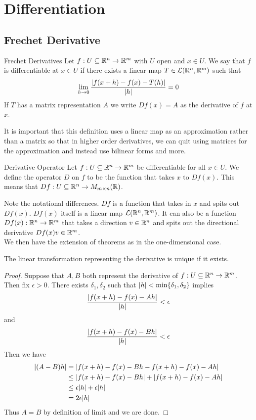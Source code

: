 \documentclass[a4paper]{article}
\begin{document}
\pagebreak
\section{Differentiation}
\subsection{Frechet Derivative}
\begin{defn}{Frechet Derivatives}{} Let $f:U\subseteq\mathbb{R}^n\to\mathbb{R}^m$ with $U$ open and $x\in U$. We say that $f$ is differentiable at $x\in U$ if there exists a linear map $T\in\mathcal{L}(\mathbb{R}^n,\mathbb{R}^m)$ such that $$\lim_{h\to 0}\frac{\abs{f(x +h)-f(x)-T(h)}}{\abs{h}}=0$$ If $T$ has a matrix representation $A$ we write $Df(x)=A$ as the derivative of $f$ at $x$. 
\end{defn}

It is important that this definition uses a linear map as an approximation rather than a matrix so that in higher order derivatives, we can quit using matrices for the approximation and instead use bilinear forms and more. 

\begin{defn}{Derivative Operator}{} Let $f:U\subseteq\mathbb{R}^n\to\mathbb{R}^m$ be differentiable for all $x\in U$. We define the operator $D$ on $f$ to be the function that takes $x$ to $Df(x)$. This means that $Df:U\subseteq\mathbb{R}^n\to M_{m\times n}(\mathbb{R})$. 
\end{defn}

Note the notational differences. $Df$ is a function that takes in $x$ and spits out $Df(x)$. $Df(x)$ itself is a linear map $\mathcal{L}(\mathbb{R}^n,\mathbb{R}^m)$. It can also be a function $Df(x):\mathbb{R}^n\to\mathbb{R}^m$ that takes a direction $v\in\mathbb{R}^n$ and spits out the directional derivative $Df(x)v\in\mathbb{R}^m$. \\

We then have the extension of theorems as in the one-dimensional case. 

\begin{thm}{}{} The linear transformation representing the derivative is unique if it exists. 
\begin{proof}
Suppose that $A,B$ both represent the derivative of $f:U\subseteq\mathbb{R}^n\to\mathbb{R}^m$. Then fix $\epsilon>0$. There exists $\delta_1,\delta_2$ such that $\abs{h}<\min\{\delta_1,\delta_2\}$ implies $$\frac{\abs{f(x+h)-f(x)-Ah}}{\abs{h}}<\epsilon$$ and $$\frac{\abs{f(x+h)-f(x)-Bh}}{\abs{h}}<\epsilon$$ Then we have 
\begin{align*}
\abs{(A-B)h}&=\abs{f(x+h)-f(x)-Bh-f(x+h)-f(x)-Ah}\\
&\leq\abs{f(x+h)-f(x)-Bh}+\abs{f(x+h)-f(x)-Ah}\\
&\leq\epsilon\abs{h}+\epsilon\abs{h}\\
&=2\epsilon\abs{h}
\end{align*}
Thus $A=B$ by definition of limit and we are done. 
\end{proof}
\end{thm}
\end{document}
